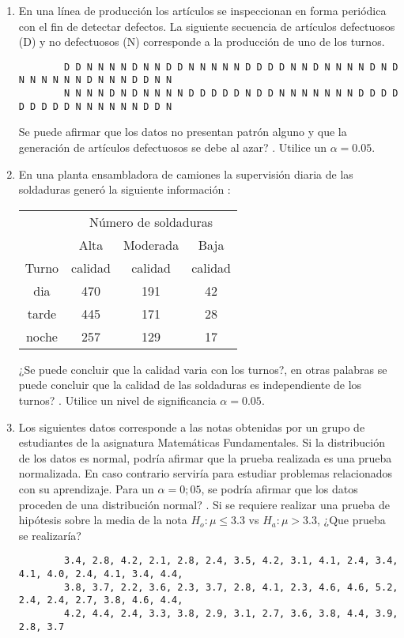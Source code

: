 \documentclass[base=hide,9pt]{elegantbook}
\begin{document}
\begin{enumerate}
	\newpage
	.
	\vspace{1.5cm}
	\item En una línea de producción los artículos se inspeccionan en forma periódica con el fin de detectar defectos. La siguiente secuencia de artículos defectuosos (D) y no defectuosos (N) corresponde a la producción de uno de los turnos. 
	\begin{verbatim}
		D D N N N N D N N D D N N N N N D D D D N N D N N N N D N D N N N N N N D N N N D D N N
		N N N N D N D N N N N D D D D D N D D N N N N N N N D D D D D D D D D N N N N N N D D N
	\end{verbatim}
	Se puede afirmar que los datos no presentan patrón alguno y que la generación de artículos defectuosos se debe al azar? . Utilice un  $\alpha= 0.05$.
	\vspace{.5cm}
	\item En una planta ensambladora de camiones la supervisión diaria de las soldaduras generó la siguiente información :\\
	\begin{center}
		\begin{tabular}{c|ccc}
			& \multicolumn{3}{c}{Número de soldaduras}\\
			& Alta    & Moderada &  Baja    \\
			Turno & calidad & calidad  &  calidad \\
			\hline
			dia   & 470     & 191      & 42 \\
			tarde & 445     & 171      & 28 \\
			noche & 257     & 129      & 17 \\
		\end{tabular}
	\end{center}
	¿Se puede concluir que la calidad varia con los turnos?, en otras palabras se puede concluir que la calidad de las soldaduras es independiente de los turnos? . Utilice un nivel de significancia $\alpha=0.05$.
	
	\vspace{.5cm}
	\item Los siguientes datos corresponde a las notas obtenidas por un grupo de estudiantes de la asignatura Matemáticas Fundamentales. Si la distribución de los datos es normal, podría afirmar que la prueba realizada es una prueba normalizada. En caso contrario serviría para estudiar problemas relacionados con su aprendizaje. Para un $\alpha= 0;05$, se podría afirmar que los datos proceden de una distribución normal? . Si se requiere realizar una prueba de hipótesis sobre la media de la nota $H_{o}:\mu \leq 3.3$ vs $H_{a}: \mu > 3.3$, ¿Que prueba se realizaría? 
	\begin{verbatim}
		3.4, 2.8, 4.2, 2.1, 2.8, 2.4, 3.5, 4.2, 3.1, 4.1, 2.4, 3.4, 4.1, 4.0, 2.4, 4.1, 3.4, 4.4,
		3.8, 3.7, 2.2, 3.6, 2.3, 3.7, 2.8, 4.1, 2.3, 4.6, 4.6, 5.2, 2.4, 2.4, 2.7, 3.8, 4.6, 4.4,
		4.2, 4.4, 2.4, 3.3, 3.8, 2.9, 3.1, 2.7, 3.6, 3.8, 4.4, 3.9, 2.8, 3.7
	\end{verbatim}
	
	
	\vspace{.5cm}
\end{enumerate}	
\end{document}
